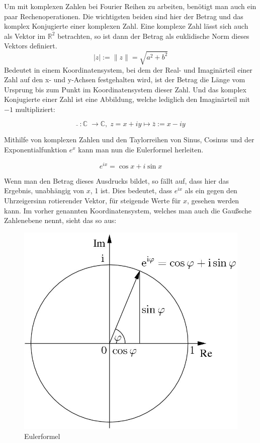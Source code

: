 \documentclass[a4paper,12pt]{article}
\theoremstyle{definition}
\theoremstyle{remark}
\begin{document}
Um mit komplexen Zahlen bei Fourier Reihen zu arbeiten, benötigt man auch ein paar Rechenoperationen. Die wichtigsten beiden sind hier der Betrag und das komplex Konjugierte einer komplexen Zahl. Eine komplexe Zahl lässt sich auch als Vektor im $\mathbb{R}^2$ betrachten, so ist dann der Betrag als euklidische Norm dieses Vektors definiert. 
$$\vert{z}\vert := \|z\| = \sqrt{ a^2 + b^2}$$
Bedeutet in einem Koordinatensystem, bei dem der Real- und Imaginärteil einer Zahl auf den x- und y-Achsen festgehalten wird, ist der Betrag die Länge vom Ursprung bis zum Punkt im Koordinatensystem dieser Zahl. 
Und das komplex Konjugierte einer Zahl ist eine Abbildung, welche lediglich den Imaginärteil mit $-1$ multipliziert:

$$\bar{}\;:\mathbb{C}\;\to\mathbb{C},\; z = x+iy \mapsto \bar{z} := x-iy$$

Mithilfe von komplexen Zahlen und den Taylorreihen von Sinus, Cosinus und der Exponentialfunktion $e^x$ kann man nun die Eulerformel herleiten. 

 $$e^{ix} = \cos{x} + i\sin{x}$$

Wenn man den Betrag dieses Ausdrucks bildet, so fällt auf, dass hier das Ergebnis, unabhängig von $x$, 1 ist. Dies bedeutet, dass $e^{ix}$ als ein gegen den Uhrzeigersinn rotierender Vektor, für steigende Werte für $x$, gesehen werden kann. Im vorher genannten Koordinatensystem, welches man auch die Gaußsche Zahlenebene nennt, sieht das so aus:
\begin{figure}[H]
\centering 
\includegraphics[scale=0.75]{Bilder/eulerformel.jpg}
\caption[scale=1]{Eulerformel}
\end{figure}
\end{document}
